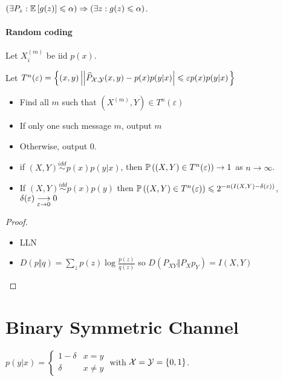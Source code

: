 $(\exists P_z : \mathbb{E}\left[ g(z) \right] \leqslant \alpha)\Rightarrow(\exists z : g(z) \leqslant \alpha)$.

\paragraph{Random coding}

Let $X_i^{(m)}$ be iid $p(x)$.

Let $T^n(\varepsilon) = \left\{ (x,y) \left\vert \left\lvert \widehat{P}_{\mathcal{X},\mathcal{Y}}(x,y) - p(x)p(y\vert x) \right\rvert \leqslant \varepsilon p(x)p(y\vert x) \right. \right\}$

\begin{itemize}
    \item Find all $m$ such that $(X^{(m)}, Y) \in T^n(\varepsilon)$
    \item If only one such message $m$, output $m$
    \item Otherwise, output 0.
\end{itemize}


\begin{lemma}
    \begin{itemize}
        \item if $(X,Y) \overset{idd}{\sim} p(x)p(y\vert x)$, then $\mathbb{P}\left( (X,Y) \in T^n(\varepsilon) \right) \to 1$ as $n\to \infty$.
        \item If $(X, Y) \overset{idd}{\sim} p(x)p(y)$ then $\mathbb{P}\left( (X,Y) \in T^n(\varepsilon) \right) \leqslant 2^{-n(I(X,Y)-\delta(\varepsilon))}$, $\delta(\varepsilon) \underset{\varepsilon \to 0}{\longrightarrow} 0$
    \end{itemize}
\end{lemma}
\begin{proof}
    \item
    \begin{itemize}
        \item LLN
        \item $D(p\Vert q) = \sum\limits_z p(z) \log\frac{p(z)}{q(z)}$ so $D(P_{XY} \Vert P_Xp_Y) = I(X,Y)$
    \end{itemize}
\end{proof}

\section{Binary Symmetric Channel}

$p(y\vert x) = \begin{cases}
    1-\delta & x = y\\
    \delta & x \neq y
\end{cases}$ with $\mathcal{X} = \mathcal{Y} = \left\{ 0,1 \right\}$.


